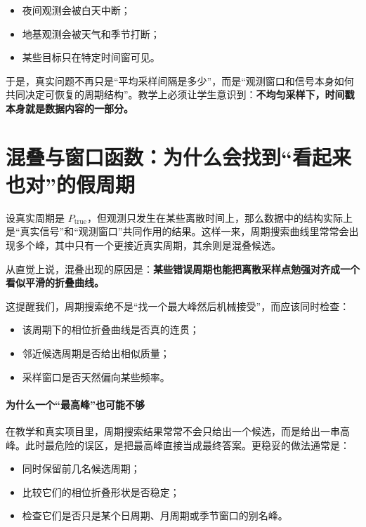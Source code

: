 \begin{itemize}
    \item 夜间观测会被白天中断；
    \item 地基观测会被天气和季节打断；
    \item 某些目标只在特定时间窗可见。
\end{itemize}

于是，真实问题不再只是“平均采样间隔是多少”，而是“观测窗口和信号本身如何共同决定可恢复的周期结构”。教学上必须让学生意识到：\textbf{不均匀采样下，时间戳本身就是数据内容的一部分。}

\section{混叠与窗口函数：为什么会找到“看起来也对”的假周期}

设真实周期是 $P_{\mathrm{true}}$，但观测只发生在某些离散时间上，那么数据中的结构实际上是“真实信号”和“观测窗口”共同作用的结果。这样一来，周期搜索曲线里常常会出现多个峰，其中只有一个更接近真实周期，其余则是混叠候选。

从直觉上说，混叠出现的原因是：\textbf{某些错误周期也能把离散采样点勉强对齐成一个看似平滑的折叠曲线。}

这提醒我们，周期搜索绝不是“找一个最大峰然后机械接受”，而应该同时检查：

\begin{itemize}
    \item 该周期下的相位折叠曲线是否真的连贯；
    \item 邻近候选周期是否给出相似质量；
    \item 采样窗口是否天然偏向某些频率。
\end{itemize}

\paragraph{为什么一个“最高峰”也可能不够}

在教学和真实项目里，周期搜索结果常常不会只给出一个候选，而是给出一串高峰。此时最危险的误区，是把最高峰直接当成最终答案。更稳妥的做法通常是：

\begin{itemize}
    \item 同时保留前几名候选周期；
    \item 比较它们的相位折叠形状是否稳定；
    \item 检查它们是否只是某个日周期、月周期或季节窗口的别名峰。
\end{itemize}

